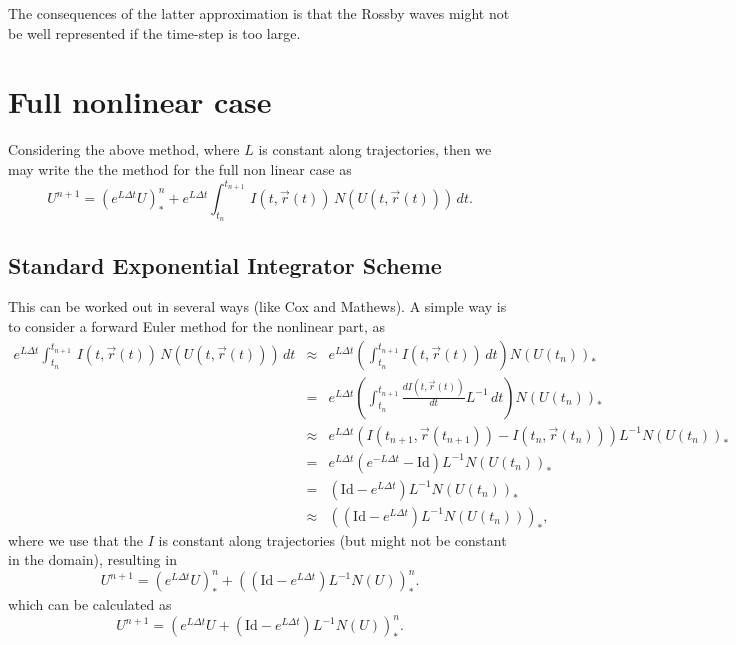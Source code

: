 \documentclass[10pt,a4paper]{article}
\begin{document}
The consequences of the latter approximation is that the Rossby waves might not be well represented if the time-step is too large.






\section{Full nonlinear case}

Considering the above method, where $L$ is constant along trajectories, then we may write the the method for the full non linear case as 
\begin{equation}
U^{n+1}=(e^{L \Delta t} U)^{n}_{*}+e^{L\Delta t}\int_{t_n}^{t_{n+1}} \, I(t, \vec{r}(t))\, N(U(t, \vec{r}(t)))\,dt.
\end{equation}

\subsection{Standard Exponential Integrator Scheme}
This can be worked out in several ways (like Cox and Mathews). A simple way is to consider a forward Euler method for the nonlinear part, as 
\begin{eqnarray*}
e^{L\Delta t}\int_{t_n}^{t_{n+1}} \, I(t, \vec{r}(t))\, N(U(t, \vec{r}(t)))\,dt &\approx & 
e^{L\Delta t} \left( \int_{t_n}^{t_{n+1}}  I(t, \vec{r}(t))\,dt \right) N(U(t_n))_*\\
&= & 
e^{L\Delta t} \left( \int_{t_n}^{t_{n+1}} \frac{d I(t, \vec{r}(t))}{dt}L^{-1}\,dt \right) N(U(t_n))_*\\
&\approx & 
e^{L\Delta t} \left(  I(t_{n+1}, \vec{r}(t_{n+1}))- I(t_{n}, \vec{r}(t_{n})) \right) L^{-1} N(U(t_n))_*\\
&= & 
e^{L\Delta t} \left( e^{-L\Delta t} - \text{Id} \right) L^{-1} N(U(t_n))_*\\
&= & 
 \left(   \text{Id} - e^{L\Delta t}\right) L^{-1} N(U(t_n))_*\\
&\approx & 
 \left(\left(   \text{Id} - e^{L\Delta t}\right) L^{-1} N(U(t_n))\right)_*,
\end{eqnarray*}
where we use that the $I$ is constant along trajectories (but might not be constant in the domain), resulting in 
\begin{equation}
U^{n+1}=(e^{L \Delta t} U)^{n}_{*}+\left(\left(   \text{Id} - e^{L\Delta t}\right) L^{-1} N(U)\right)^{n}_*.
\end{equation}
which can be calculated as
\begin{equation}
U^{n+1}=\left(e^{L \Delta t} U+\left(   \text{Id} - e^{L\Delta t}\right) L^{-1} N(U)\right)^{n}_*.
\end{equation}
\end{document}
